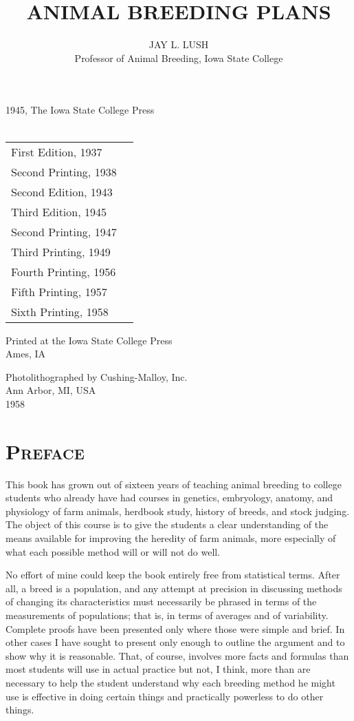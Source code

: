 \documentclass[letterpaper, 12pt, onecolumn]{book}
\title{ANIMAL BREEDING PLANS}
\author{JAY L. LUSH\\Professor of Animal Breeding, Iowa State College}
\begin{document}
\frontmatter
\maketitle

\begin{center}
\textcopyright{} 1945, The Iowa State College Press\\
 ~\\
\begin{tabular}{ll}
	First Edition, 1937\\
	Second Printing, 1938\\
	Second Edition, 1943\\
	Third Edition, 1945\\
	Second Printing, 1947\\
	Third Printing, 1949\\
	Fourth Printing, 1956\\
	Fifth Printing, 1957\\
	Sixth Printing, 1958\\
\end{tabular}
\vfill
\vfill
Printed at the Iowa State College Press\\
Ames, IA

Photolithographed by Cushing-Malloy, Inc.\\
Ann Arbor, MI, USA\\
1958
\end{center}

\chapter{\textsc{Preface}}
This book has grown out of sixteen years of teaching animal breeding to college students who already have had
courses in genetics, embryology, anatomy, and physiology of farm animals, herdbook study, history of breeds,
and stock judging. The object of this course is to give the students a clear understanding of the means available
for improving the heredity of farm animals, more especially of what each possible method will or will not do well.

No effort of mine could keep the book entirely free from statistical terms. After all, a breed is a population, and
any attempt at precision in discussing methods of changing its characteristics must necessarily be phrased in terms
of the measurements of populations; that is, in terms of averages and of variability. Complete proofs have been
presented only where those were simple and brief. In other cases I have sought to present only enough to outline the 
argument and to show why it is reasonable. That, of course, involves more facts and formulas than most students will use 
in actual practice but not, I think, more than are necessary to help the student understand why each breeding method he 
might use is effective in doing certain things and practically powerless to do other things.
\end{document}
